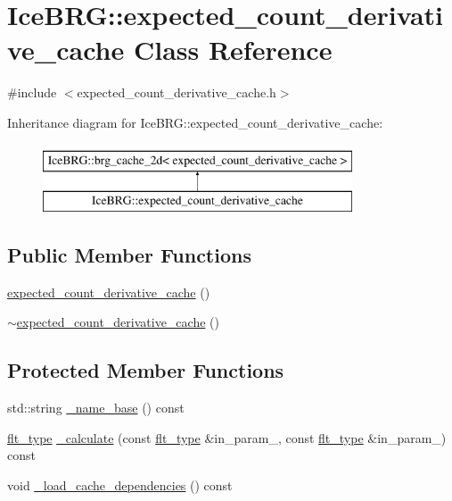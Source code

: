 \hypertarget{classIceBRG_1_1expected__count__derivative__cache}{\section{Ice\-B\-R\-G\-:\-:expected\-\_\-count\-\_\-derivative\-\_\-cache Class Reference}
\label{classIceBRG_1_1expected__count__derivative__cache}
}


{\ttfamily \#include $<$expected\-\_\-count\-\_\-derivative\-\_\-cache.\-h$>$}

Inheritance diagram for Ice\-B\-R\-G\-:\-:expected\-\_\-count\-\_\-derivative\-\_\-cache\-:\begin{figure}[H]
\begin{center}
\leavevmode
\includegraphics[height=2.000000cm]{classIceBRG_1_1expected__count__derivative__cache}
\end{center}
\end{figure}
\subsection*{Public Member Functions}
\begin{DoxyCompactItemize}
\item 
\hyperlink{classIceBRG_1_1expected__count__derivative__cache_a63a6e862842c52e5bf31ffea28828733}{expected\-\_\-count\-\_\-derivative\-\_\-cache} ()
\item 
\hyperlink{classIceBRG_1_1expected__count__derivative__cache_a006d6761d4ad94e582a565079035ac17}{$\sim$expected\-\_\-count\-\_\-derivative\-\_\-cache} ()
\end{DoxyCompactItemize}
\subsection*{Protected Member Functions}
\begin{DoxyCompactItemize}
\item 
std\-::string \hyperlink{classIceBRG_1_1expected__count__derivative__cache_abb662544efc6301f169336a3cb6fa08a}{\-\_\-name\-\_\-base} () const 
\item 
\hyperlink{lib_2IceBRG__main_2common_8h_ad0f130a56eeb944d9ef2692ee881ecc4}{flt\-\_\-type} \hyperlink{classIceBRG_1_1expected__count__derivative__cache_abc9c512709d23669a982a40c8e0613cf}{\-\_\-calculate} (const \hyperlink{lib_2IceBRG__main_2common_8h_ad0f130a56eeb944d9ef2692ee881ecc4}{flt\-\_\-type} \&in\-\_\-param\-\_, const \hyperlink{lib_2IceBRG__main_2common_8h_ad0f130a56eeb944d9ef2692ee881ecc4}{flt\-\_\-type} \&in\-\_\-param\-\_) const 
\item 
void \hyperlink{classIceBRG_1_1expected__count__derivative__cache_a3f883c9118416c4bca3fbca8327a6267}{\-\_\-load\-\_\-cache\-\_\-dependencies} () const 
\end{DoxyCompactItemize}
